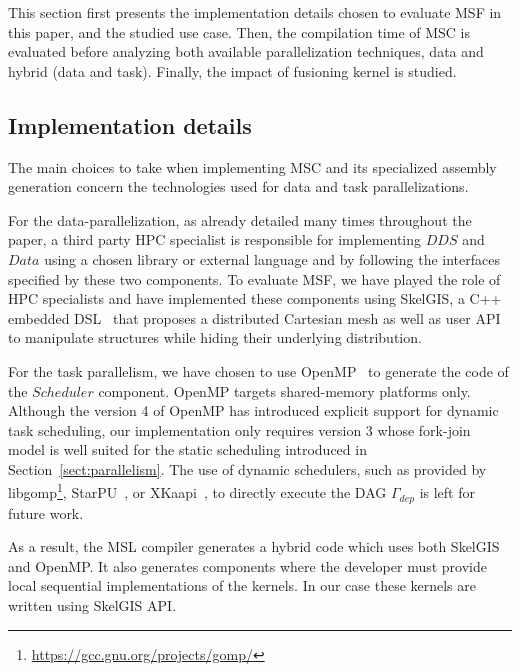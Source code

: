 This section first presents the implementation details chosen to evaluate MSF in this paper, and the studied use case. Then, the compilation time of MSC is evaluated before analyzing both available parallelization techniques, data and hybrid (data and task). Finally, the impact of fusioning kernel is studied.

\subsection{Implementation details}

The main choices to take when implementing MSC and its specialized assembly generation concern the technologies used for data and task parallelizations.

For the data-parallelization, as already detailed many times throughout the paper, a third party HPC specialist is responsible for implementing $DDS$ and $Data$ using a chosen library or external language and by following the interfaces specified by these two components. To evaluate MSF, we have played the role of HPC specialists and have implemented these components using SkelGIS, a C++ embedded DSL~\cite{CPE:CPE3494} that proposes a distributed Cartesian mesh as well as user API to manipulate structures while hiding their underlying distribution.

For the task parallelism, we have chosen to use OpenMP~\cite{660313} to generate the code of the $Scheduler$ component. OpenMP targets shared-memory platforms only. Although the version 4 of OpenMP has introduced explicit support for dynamic task scheduling, our implementation only requires version 3 whose fork-join model is well suited for the static scheduling introduced in Section~\ref{sect:parallelism}.
The use of dynamic schedulers, such as provided by libgomp\footnote{\url{https://gcc.gnu.org/projects/gomp/}}, StarPU~\cite{Augonnet2011}, or XKaapi~\cite{Gautier:2013:XRS:2510661.2511383},  to directly execute the DAG $\Gamma_{dep}$ is left for future work.

As a result, the MSL compiler generates a hybrid code which uses both SkelGIS and OpenMP.
It also generates components where the developer must provide local sequential implementations of the kernels. In our case these kernels are written using SkelGIS API.

